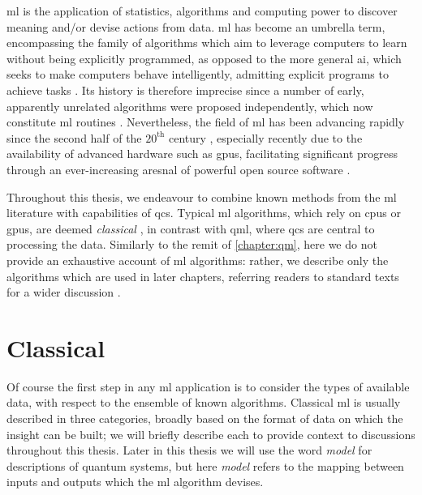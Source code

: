 \Gls{ml} is the application of statistics, algorithms and computing power to discover meaning and/or devise actions from data.
\gls{ml} has become an umbrella term, encompassing the family of algorithms
    which aim to leverage computers to learn without being explicitly programmed,
    as opposed to the more general \gls{ai}, which seeks to make computers behave intelligently,
    admitting explicit programs to achieve tasks \cite{MLvAI}.
Its history is therefore imprecise since a number of early, apparently unrelated algorithms were proposed independently, 
    which now constitute \gls{ml} routines \cite{mcculloch1943logical, turing2009computing}. 
Nevertheless, the field of \gls{ml} has been advancing rapidly since the second half of the $20^{\textrm{th}}$ century \cite{russell2002artificial}, 
    especially recently due to the availability of advanced hardware such as \glspl{gpu}, 
    facilitating significant progress through an ever-increasing aresnal of powerful open source software \cite{pedregosa2011scikit, abadi2016tensorflow, paszke2019pytorch}. 
\par 

Throughout this thesis, we endeavour to combine known methods from the \gls{ml} literature with capabilities of \glspl{qc}\footnotemark. 
Typical \gls{ml} algorithms, which rely on \glspl{cpu} or \glspl{gpu}, are deemed \emph{classical} ,
    in contrast with \gls{qml}, where \glspl{qc} are central to processing the data.
Similarly to the remit of \cref{chapter:qm}, here we do not provide an exhaustive account of \gls{ml} algorithms:
    rather, we describe only the algorithms which are used in later chapters, 
    referring readers to standard texts for a wider discussion \cite{russell2002artificial, hastie2009elements}.



\section{Classical }\label{sec:classical_ml}

Of course the first step in any \gls{ml} application is to consider the types of available data,
    with respect to the ensemble of known algorithms. 
Classical \gls{ml} is usually described in three categories,
    broadly based on the format of data on which the insight can be built;
    we will briefly describe each to provide context to discussions throughout this thesis. 
Later in this thesis we will use the word \emph{model} for descriptions of quantum systems, 
    but here \emph{model} refers to the mapping between inputs and outputs which the \gls{ml} algorithm devises.
\par 


